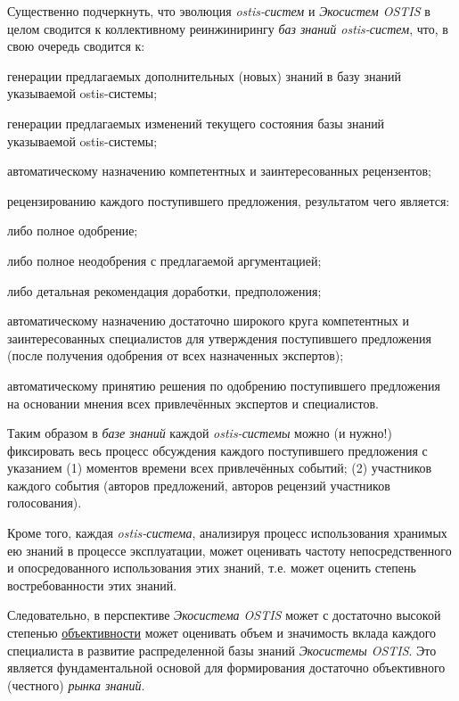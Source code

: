 {Существенно подчеркнуть, что эволюция \textit{ostis-систем} и \textit{Экосистем OSTIS} в целом сводится к коллективному реинжинирингу \textit{баз знаний ostis-систем}, что, в свою очередь сводится к:
	\begin{scnitemize}
	\item {} генерации предлагаемых дополнительных (новых) знаний в базу знаний указываемой \mbox{ostis-системы};
	\item {} генерации предлагаемых изменений текущего состояния
базы знаний указываемой ostis-системы;
	\item автоматическому назначению компетентных и заинтересованных
рецензентов;
	\item {} рецензированию каждого поступившего предложения,
результатом чего является:
		\begin{scnitemizeii}
		\item либо полное одобрение;
		\item либо полное неодобрения с предлагаемой аргументацией;		
		\item либо детальная рекомендация доработки, предположения;		
		\end{scnitemizeii}
	\item автоматическому назначению достаточно широкого круга компетентных и заинтересованных специалистов для утверждения
поступившего предложения (после получения одобрения от всех назначенных экспертов);
	\item автоматическому принятию решения по одобрению поступившего
предложения на основании мнения всех привлечённых экспертов и
специалистов.
	\end{scnitemize}

Таким образом в \textit{базе знаний} каждой \textit{ostis-системы} можно (и нужно!)
фиксировать весь процесс обсуждения каждого поступившего предложения с
указанием (1) моментов времени всех привлечённых событий; (2) участников каждого события (авторов предложений, авторов рецензий участников голосования).

Кроме того, каждая \textit{ostis-система}, анализируя процесс использования
хранимых ею знаний в процессе эксплуатации, может оценивать частоту
непосредственного и опосредованного использования этих знаний, т.е. может оценить степень востребованности этих знаний.	

Следовательно, в перспективе \textit{Экосистема OSTIS} может с достаточно
высокой степенью \uline{объективности} может оценивать объем и значимость вклада каждого специалиста в развитие распределенной базы знаний \textit{Экосистемы OSTIS}. Это является фундаментальной основой для
формирования достаточно объективного (честного) \textit{рынка знаний}.}

